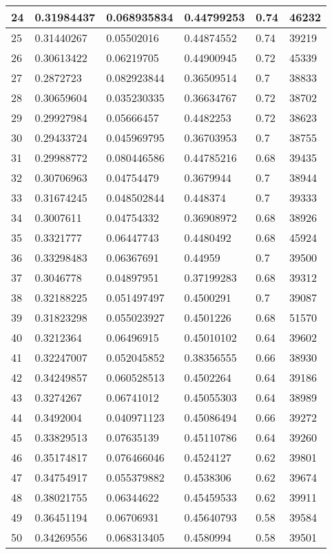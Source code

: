 \begin{longtable}{|l|l|l|l|l|l|}
24 & 0.31984437 & 0.068935834 & 0.44799253 & 0.74 & 46232 \\ \hline 
25 & 0.31440267 & 0.05502016 & 0.44874552 & 0.74 & 39219 \\ \hline 
26 & 0.30613422 & 0.06219705 & 0.44900945 & 0.72 & 45339 \\ \hline 
27 & 0.2872723 & 0.082923844 & 0.36509514 & 0.7 & 38833 \\ \hline 
28 & 0.30659604 & 0.035230335 & 0.36634767 & 0.72 & 38702 \\ \hline 
29 & 0.29927984 & 0.05666457 & 0.4482253 & 0.72 & 38623 \\ \hline 
30 & 0.29433724 & 0.045969795 & 0.36703953 & 0.7 & 38755 \\ \hline 
31 & 0.29988772 & 0.080446586 & 0.44785216 & 0.68 & 39435 \\ \hline 
32 & 0.30706963 & 0.04754479 & 0.3679944 & 0.7 & 38944 \\ \hline 
33 & 0.31674245 & 0.048502844 & 0.448374 & 0.7 & 39333 \\ \hline 
34 & 0.3007611 & 0.04754332 & 0.36908972 & 0.68 & 38926 \\ \hline 
35 & 0.3321777 & 0.06447743 & 0.4480492 & 0.68 & 45924 \\ \hline 
36 & 0.33298483 & 0.06367691 & 0.44959 & 0.7 & 39500 \\ \hline 
37 & 0.3046778 & 0.04897951 & 0.37199283 & 0.68 & 39312 \\ \hline 
38 & 0.32188225 & 0.051497497 & 0.4500291 & 0.7 & 39087 \\ \hline 
39 & 0.31823298 & 0.055023927 & 0.4501226 & 0.68 & 51570 \\ \hline 
40 & 0.3212364 & 0.06496915 & 0.45010102 & 0.64 & 39602 \\ \hline 
41 & 0.32247007 & 0.052045852 & 0.38356555 & 0.66 & 38930 \\ \hline 
42 & 0.34249857 & 0.060528513 & 0.4502264 & 0.64 & 39186 \\ \hline 
43 & 0.3274267 & 0.06741012 & 0.45055303 & 0.64 & 38989 \\ \hline 
44 & 0.3492004 & 0.040971123 & 0.45086494 & 0.66 & 39272 \\ \hline 
45 & 0.33829513 & 0.07635139 & 0.45110786 & 0.64 & 39260 \\ \hline 
46 & 0.35174817 & 0.076466046 & 0.4524127 & 0.62 & 39801 \\ \hline 
47 & 0.34754917 & 0.055379882 & 0.4538306 & 0.62 & 39674 \\ \hline 
48 & 0.38021755 & 0.06344622 & 0.45459533 & 0.62 & 39911 \\ \hline 
49 & 0.36451194 & 0.06706931 & 0.45640793 & 0.58 & 39584 \\ \hline 
50 & 0.34269556 & 0.068313405 & 0.4580994 & 0.58 & 39501 \\ \hline 
\end{longtable}